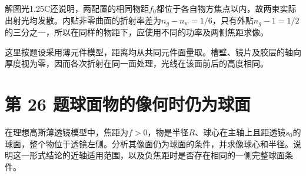 \documentclass[UTF8,fontset=fandol,a4paper,11pt]{ctexart}
\begin{document}
解图光1.25C还说明，两配置的相同物距$f_0$都位于各自物方焦点以内，故两束实际出射光均发散。内贴非零曲面的折射率差为$n_g-n_w=1/6$，只有外贴$n_g-1=1/2$的三分之一，所以在同样的物距下，应使用不同的功率及两侧焦距求像。

这里按题设采用薄元件模型，距离均从共同元件面量取。槽壁、镜片及胶层的轴向厚度视为零，因而各次折射在同一面处理，光线在该面前后的高度相同。




\section*{第 26 题\quad 球面物的像何时仍为球面}\label{q:26}

在理想高斯薄透镜模型中，焦距为$f>0$，物是半径$R$、球心在主轴上且距透镜$s_0$的球面，整个物位于透镜左侧。分析其像面仍为球面的条件，并求像球心和半径。说明这一形式结论的近轴适用范围，以及负焦距时是否存在相同的一侧完整球面条件。
\end{document}
